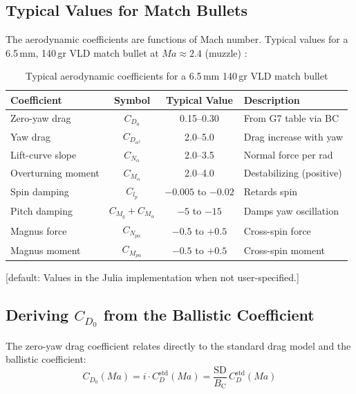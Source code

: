 \documentclass[11pt,twoside,openright]{report}
\newcommand{\Bc}{B_{\mathrm{C}}}
\newcommand{\Mach}{\mathit{Ma}}
\newcommand{\sd}{\mathrm{SD}}
\newcommand{\default}[1]{\;\textrm{\textcolor{blue!60!black}{[default: #1]}}}
\begin{document}
\subsection{Typical Values for Match Bullets}

The aerodynamic coefficients are functions of Mach number. Typical values for a 6.5\,mm, 140\,gr VLD match bullet at $\Mach \approx 2.4$ (muzzle) \citep{mccoy1999modern, carlucci2007ballistics}:

\begin{table}[H]
\centering
\caption{Typical aerodynamic coefficients for a 6.5\,mm 140\,gr VLD match bullet}
\label{tab:aero_coeffs}
\begin{tabular}{@{}lccl@{}}
\toprule
\textbf{Coefficient} & \textbf{Symbol} & \textbf{Typical Value} & \textbf{Description} \\
\midrule
Zero-yaw drag & $C_{D_0}$ & 0.15--0.30 & From G7 table via BC \\
Yaw drag & $C_{D_{\alpha^2}}$ & 2.0--5.0 & Drag increase with yaw \\
Lift-curve slope & $C_{N_\alpha}$ & 2.0--3.5 & Normal force per rad \\
Overturning moment & $C_{M_\alpha}$ & 2.0--4.0 & Destabilizing (positive) \\
Spin damping & $C_{l_p}$ & $-0.005$ to $-0.02$ & Retards spin \\
Pitch damping & $C_{M_q}+C_{M_{\dot\alpha}}$ & $-5$ to $-15$ & Damps yaw oscillation \\
Magnus force & $C_{N_{p\alpha}}$ & $-0.5$ to $+0.5$ & Cross-spin force \\
Magnus moment & $C_{M_{p\alpha}}$ & $-0.5$ to $+0.5$ & Cross-spin moment \\
\bottomrule
\end{tabular}
\end{table}

\default{Values in the Julia implementation when not user-specified.}

\subsection{Deriving $C_{D_0}$ from the Ballistic Coefficient}

The zero-yaw drag coefficient relates directly to the standard drag model and the ballistic coefficient:
\begin{equation}
  C_{D_0}(\Mach) = i \cdot C_D^{\mathrm{std}}(\Mach) = \frac{\sd}{\Bc}\,C_D^{\mathrm{std}}(\Mach)
  \label{eq:cd0_from_bc}
\end{equation}
\end{document}
